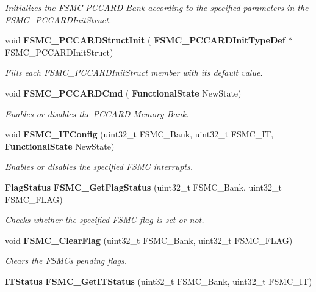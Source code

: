 \begin{DoxyCompactItemize}
\begin{DoxyCompactList}\small\item\em Initializes the F\+S\+MC P\+C\+C\+A\+RD Bank according to the specified parameters in the F\+S\+M\+C\+\_\+\+P\+C\+C\+A\+R\+D\+Init\+Struct. \end{DoxyCompactList}\item 
void \textbf{ F\+S\+M\+C\+\_\+\+P\+C\+C\+A\+R\+D\+Struct\+Init} (\textbf{ F\+S\+M\+C\+\_\+\+P\+C\+C\+A\+R\+D\+Init\+Type\+Def} $\ast$F\+S\+M\+C\+\_\+\+P\+C\+C\+A\+R\+D\+Init\+Struct)
\begin{DoxyCompactList}\small\item\em Fills each F\+S\+M\+C\+\_\+\+P\+C\+C\+A\+R\+D\+Init\+Struct member with its default value. \end{DoxyCompactList}\item 
void \textbf{ F\+S\+M\+C\+\_\+\+P\+C\+C\+A\+R\+D\+Cmd} (\textbf{ Functional\+State} New\+State)
\begin{DoxyCompactList}\small\item\em Enables or disables the P\+C\+C\+A\+RD Memory Bank. \end{DoxyCompactList}\item 
void \textbf{ F\+S\+M\+C\+\_\+\+I\+T\+Config} (uint32\+\_\+t F\+S\+M\+C\+\_\+\+Bank, uint32\+\_\+t F\+S\+M\+C\+\_\+\+IT, \textbf{ Functional\+State} New\+State)
\begin{DoxyCompactList}\small\item\em Enables or disables the specified F\+S\+MC interrupts. \end{DoxyCompactList}\item 
\textbf{ Flag\+Status} \textbf{ F\+S\+M\+C\+\_\+\+Get\+Flag\+Status} (uint32\+\_\+t F\+S\+M\+C\+\_\+\+Bank, uint32\+\_\+t F\+S\+M\+C\+\_\+\+F\+L\+AG)
\begin{DoxyCompactList}\small\item\em Checks whether the specified F\+S\+MC flag is set or not. \end{DoxyCompactList}\item 
void \textbf{ F\+S\+M\+C\+\_\+\+Clear\+Flag} (uint32\+\_\+t F\+S\+M\+C\+\_\+\+Bank, uint32\+\_\+t F\+S\+M\+C\+\_\+\+F\+L\+AG)
\begin{DoxyCompactList}\small\item\em Clears the F\+S\+MC\textquotesingle{}s pending flags. \end{DoxyCompactList}\item 
\textbf{ I\+T\+Status} \textbf{ F\+S\+M\+C\+\_\+\+Get\+I\+T\+Status} (uint32\+\_\+t F\+S\+M\+C\+\_\+\+Bank, uint32\+\_\+t F\+S\+M\+C\+\_\+\+IT)

\end{DoxyCompactItemize}
